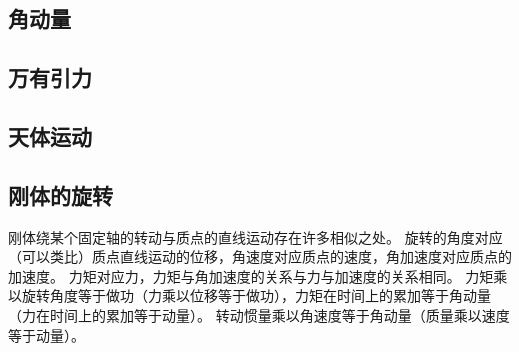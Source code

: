 
\subsection{角动量}

\subsection{万有引力}

\subsection{天体运动}

\subsection{刚体的旋转}
刚体绕某个固定轴的转动与质点的直线运动存在许多相似之处。 旋转的角度对应（可以类比）质点直线运动的位移，角速度对应质点的速度，角加速度对应质点的加速度。 力矩对应力，力矩与角加速度的关系与力与加速度的关系相同。 力矩乘以旋转角度等于做功（力乘以位移等于做功），力矩在时间上的累加等于角动量（力在时间上的累加等于动量）。 转动惯量乘以角速度等于角动量（质量乘以速度等于动量）。

